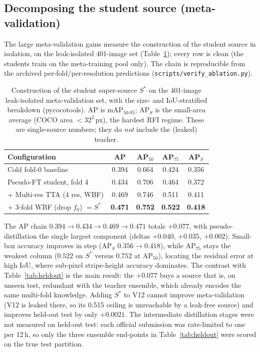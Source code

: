 \documentclass{article}
\begin{document}
\subsection{Decomposing the student source (meta-validation)}

The large meta-validation gains measure the construction of the student
source in isolation, on the leak-isolated 401-image set
(Table~\ref{tab:ablation}); every row is clean (the students train on
the meta-training pool only). The chain is reproducible from the
archived per-fold/per-resolution predictions
(\texttt{scripts/verify\_ablation.py}).

\begin{table}[t]
\centering
\caption{Construction of the student super-source $S^{*}$ on the
401-image leak-isolated meta-validation set, with the size- and
IoU-stratified breakdown (pycocotools). AP is mAP$_{50\text{-}95}$;
AP$_S$ is the small-area average (COCO area $<32^2$\,px), the hardest
RFI regime. These are single-source numbers; they do \emph{not} include
the (leaked) teacher.}
\label{tab:ablation}
\small
\setlength{\tabcolsep}{4.5pt}
\begin{tabular}{lcccc}
\toprule
\textbf{Configuration} & \textbf{AP} & \textbf{AP$_{50}$} & \textbf{AP$_{75}$} & \textbf{AP$_S$} \\
\midrule
Cold fold-0 baseline               & 0.394 & 0.664 & 0.424 & 0.356 \\
Pseudo-FT student, fold 4          & 0.434 & 0.706 & 0.464 & 0.372 \\
+ Multi-res TTA (4 res, WBF)       & 0.469 & 0.746 & 0.511 & 0.411 \\
+ 3-fold WBF (drop $f_0$) $=S^{*}$ & \textbf{0.471} & \textbf{0.752} & \textbf{0.522} & \textbf{0.418} \\
\bottomrule
\end{tabular}
\end{table}

The AP chain $0.394 \to 0.434 \to 0.469 \to 0.471$ totals $+0.077$, with
pseudo-distillation the single largest component (deltas $+0.040$,
$+0.035$, $+0.002$). Small-box accuracy improves in step (AP$_S$
$0.356\to0.418$), while AP$_{75}$ stays the weakest column ($0.522$ on
$S^{*}$ versus $0.752$ at AP$_{50}$), locating the residual error at
high IoU, where sub-pixel stripe-height accuracy dominates. The contrast with
Table~\ref{tab:heldout} is the main result: the $+0.077$ buys a source
that is, on unseen test, redundant with the teacher ensemble, which
already encodes the same multi-fold knowledge. Adding $S^{*}$ to V12
cannot improve meta-validation (V12 is leaked there, so its 0.515
ceiling is unreachable by a leak-free source) and improves held-out
test by only $+0.0021$. The intermediate distillation stages were not
measured on held-out test: each official submission was rate-limited to
one per 12\,h, so only the three
ensemble end-points in Table~\ref{tab:heldout} were scored on the true
test partition.
\end{document}
